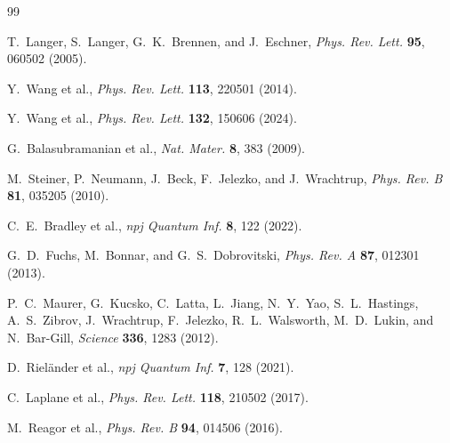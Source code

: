 \documentclass[aps,prapplied,reprint,superscriptaddress]{revtex4-2}
\begin{document}
\begin{thebibliography}{99}

T.~Langer, S.~Langer, G.~K.~Brennen, and J.~Eschner,
\textit{Phys. Rev. Lett.} \textbf{95}, 060502 (2005).

Y.~Wang et al.,
\textit{Phys. Rev. Lett.} \textbf{113}, 220501 (2014).

Y.~Wang et al.,
\textit{Phys. Rev. Lett.} \textbf{132}, 150606 (2024).

G.~Balasubramanian et al.,
\textit{Nat. Mater.} \textbf{8}, 383 (2009).

M.~Steiner, P.~Neumann, J.~Beck, F.~Jelezko, and J.~Wrachtrup,
\textit{Phys. Rev. B} \textbf{81}, 035205 (2010).

C.~E.~Bradley et al.,
\textit{npj Quantum Inf.} \textbf{8}, 122 (2022).

G.~D.~Fuchs, M.~Bonnar, and G.~S.~Dobrovitski,
\textit{Phys. Rev. A} \textbf{87}, 012301 (2013).

P.~C.~Maurer, G.~Kucsko, C.~Latta, L.~Jiang, N.~Y.~Yao, S.~L.~Hastings, A.~S.~Zibrov, J.~Wrachtrup, F.~Jelezko, R.~L.~Walsworth, M.~D.~Lukin, and N.~Bar-Gill,
\textit{Science} \textbf{336}, 1283 (2012).

D.~Riel\"ander et al.,
\textit{npj Quantum Inf.} \textbf{7}, 128 (2021).

C.~Laplane et al.,
\textit{Phys. Rev. Lett.} \textbf{118}, 210502 (2017).

M.~Reagor et al.,
\textit{Phys. Rev. B} \textbf{94}, 014506 (2016).

\end{thebibliography}
\end{document}
